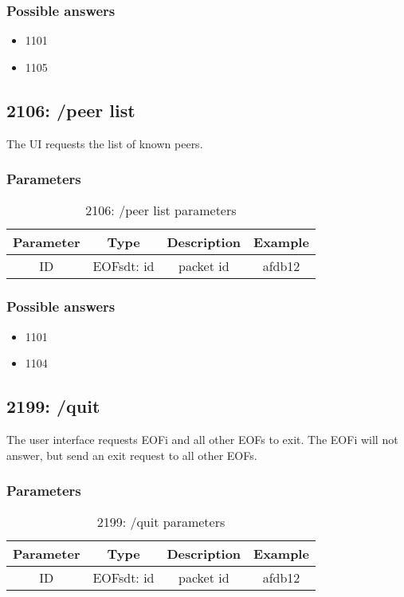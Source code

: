 \documentclass[12pt,a4paper]{book}
\begin{document}
\subsubsection{Possible answers}
\begin{itemize}
\item 1101
\item 1105
\end{itemize}
\subsection{2106: /peer list}
The UI requests the list of known peers.

\subsubsection{Parameters}
\begin{longtable}{|c|c|c|c|}
\caption{2106: /peer list parameters}\\
\hline
\textbf{Parameter} & \textbf{Type} & \textbf{Description} & \textbf{Example}\\
\hline
ID & EOFsdt: id & packet id & afdb12\\
\hline
\end{longtable}

\subsubsection{Possible answers}
\begin{itemize}
\item 1101
\item 1104
\end{itemize}
\subsection{2199: /quit}
The user interface requests EOFi and all other EOFs to exit.
The EOFi will not answer, but send an exit request to all other
EOFs.

\subsubsection{Parameters}
\begin{longtable}{|c|c|c|c|}
\caption{2199: /quit parameters}\\
\hline
\textbf{Parameter} & \textbf{Type} & \textbf{Description} & \textbf{Example}\\
\hline
ID & EOFsdt: id & packet id & afdb12\\
\hline
\end{longtable}
\end{document}
